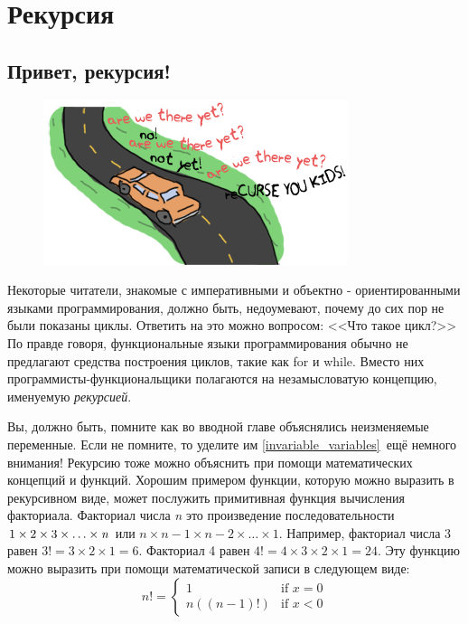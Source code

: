 \documentclass[a4paper,12pt]{report}
\newcommand{\ops}{\colorbox{lgreen}}
\begin{document}
\chapter{Рекурсия}
\label{recursion}
\section{Привет, рекурсия!}
\begin{figure}
    \includegraphics[width=1\linewidth]{reCURSE.png}
\end{figure}
Некоторые читатели, знакомые с императивными и объектно \-- ориентированными языками программирования, должно быть, недоумевают, почему до сих пор не были показаны циклы. Ответить на это можно вопросом: <<Что такое цикл?>> По правде говоря, функциональные языки программирования обычно не предлагают средства построения циклов, такие как \ops{for} и \ops{while}. Вместо них программисты\--функциональщики полагаются на незамысловатую концепцию, именуемую \emph{рекурсией}.

Вы, должно быть, помните как во вводной главе объяснялись неизменяемые переменные. Если не помните, то уделите им \ref{invariable_variables}{~ещё немного внимания}! Рекурсию тоже можно объяснить при помощи математических концепций и функций. Хорошим примером функции, которую можно выразить в рекурсивном виде, может послужить примитивная функция вычисления факториала. Факториал числа \emph{n} это произведение последовательности \ops{$1\times 2\times3\times\ldots\times\emph{n}$} или \ops{$n\times n-1 \times n-2\times\ldots\times 1$}. Например, факториал числа 3 равен \ops{$3! = 3 \times 2 \times 1 = 6$}. Факториал 4 равен \ops{$4! = 4 \times 3 \times 2 \times 1 = 24$}. Эту функцию можно выразить при помощи математической записи в следующем виде:
\[
n! =
  \begin{cases}
   1           & \text{if } x = 0 \\
   n((n - 1)!) & \text{if } x < 0
  \end{cases}
\]
\end{document}
